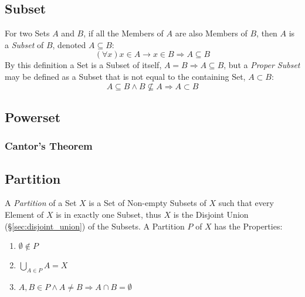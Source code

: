 \subsection{Subset}\label{sec:subset}

For two Sets $A$ and $B$, if all the Members of $A$ are also Members
of $B$, then $A$ is a \emph{Subset} of $B$, denoted $A \subseteq B$:
\[
  (\forall x) x \in A \rightarrow x \in B \Rightarrow A \subseteq B
\]
By this definition a Set is a Subset of itself, $A = B \Rightarrow A
\subseteq B$, but a \emph{Proper Subset} may be defined as a Subset
that is not equal to the containing Set, $A \subset B$:
\[
  A \subseteq B \wedge B \nsubseteq A \Rightarrow A \subset B
\]



\subsection{Powerset}\label{sec:powerset}

\subsubsection{Cantor's Theorem}\label{sec:cantors_theorem}



\subsection{Partition}\label{sec:partition}

A \emph{Partition} of a Set $X$ is a Set of Non-empty Subsets of $X$
such that every Element of $X$ is in exactly one Subset, thus $X$ is
the Disjoint Union (\S\ref{sec:disjoint_union}) of the Subsets. A
Partition $P$ of $X$ has the Properties:
\begin{enumerate}
  \item $\emptyset \notin P$
  \item $\bigcup_{A \in P}A = X$
  \item $A,B \in P \wedge A \neq B \Rightarrow A \cap B = \emptyset$
\end{enumerate}



